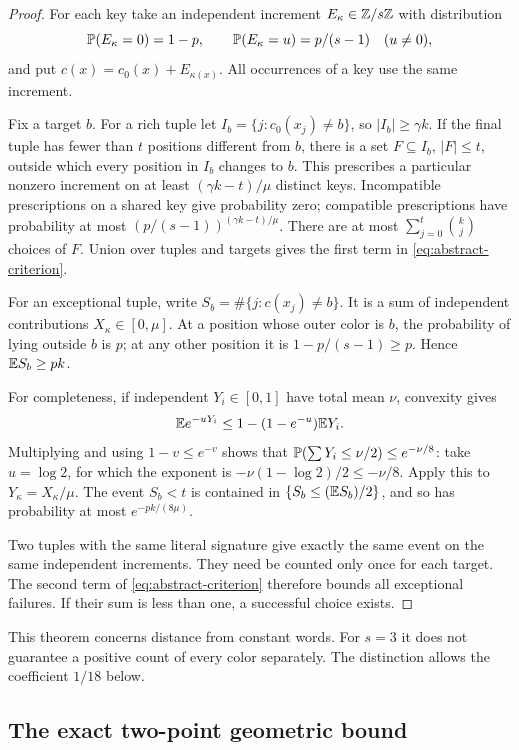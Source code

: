 \begin{proof}
For each key take an independent increment \(E_\kappa\in\mathbb Z/s\mathbb Z\)
with distribution
\[
 \mathbb P(E_\kappa=0)=1-p,\qquad
 \mathbb P(E_\kappa=u)=p/(s-1)\quad(u\ne0),
\]
and put \(c(x)=c_0(x)+E_{\kappa(x)}\).
All occurrences of a key use the same increment.

Fix a target \(b\). For a rich tuple let
\(I_b=\{j:c_0(x_j)\ne b\}\), so \(|I_b|\ge\gamma k\).
If the final tuple has fewer than \(t\) positions different from \(b\),
there is a set \(F\subseteq I_b\), \(|F|\le t\), outside which
every position in \(I_b\) changes to \(b\).
This prescribes a particular nonzero increment on at least
\((\gamma k-t)/\mu\) distinct keys.
Incompatible prescriptions on a shared key give probability zero;
compatible prescriptions have probability at most
\((p/(s-1))^{(\gamma k-t)/\mu}\).
There are at most \(\sum_{j=0}^t\binom kj\) choices of \(F\).
Union over tuples and targets gives the first term in
\eqref{eq:abstract-criterion}.

For an exceptional tuple, write
\(S_b=\#\{j:c(x_j)\ne b\}\).
It is a sum of independent contributions \(X_\kappa\in[0,\mu]\).
At a position whose outer color is \(b\), the probability of lying
outside \(b\) is \(p\); at any other position it is
\(1-p/(s-1)\ge p\). Hence
\(\mathbb E S_b\ge pk\).

For completeness, if independent \(Y_i\in[0,1]\) have total mean
\(\nu\), convexity gives
\[
 \mathbb E e^{-uY_i}\le1-(1-e^{-u})\mathbb E Y_i.
\]
Multiplying and using \(1-v\le e^{-v}\) shows that
\(\mathbb P(\sum Y_i\le\nu/2)\le e^{-\nu/8}\):
take \(u=\log2\), for which the exponent is
\(-\nu(1-\log2)/2\le-\nu/8\).
Apply this to \(Y_\kappa=X_\kappa/\mu\).
The event \(S_b<t\) is contained in
\(\{S_b\le(\mathbb E S_b)/2\}\), and so has probability at most
\(e^{-pk/(8\mu)}\).

Two tuples with the same literal signature give exactly the same
event on the same independent increments. They need be counted only
once for each target. The second term of
\eqref{eq:abstract-criterion} therefore bounds all exceptional failures.
If their sum is less than one, a successful choice exists.
\end{proof}

This theorem concerns distance from constant words. For \(s=3\) it does
not guarantee a positive count of every color separately. The distinction
allows the coefficient \(1/18\) below.

\subsection{The exact two-point geometric bound}

